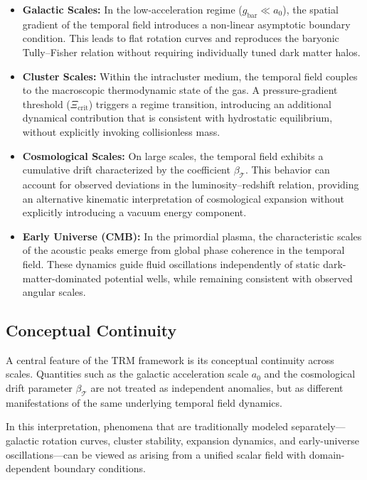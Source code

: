 \documentclass[11pt]{article}
\begin{document}
	\begin{itemize}

		\item \textbf{Galactic Scales:}
		In the low-acceleration regime ($g_{\mathrm{bar}} \ll a_0$), the spatial gradient of the temporal field introduces a non-linear asymptotic boundary condition. This leads to flat rotation curves and reproduces the baryonic Tully--Fisher relation without requiring individually tuned dark matter halos.

		\item \textbf{Cluster Scales:}
		Within the intracluster medium, the temporal field couples to the macroscopic thermodynamic state of the gas. A pressure-gradient threshold ($\Xi_{\mathrm{crit}}$) triggers a regime transition, introducing an additional dynamical contribution that is consistent with hydrostatic equilibrium, without explicitly invoking collisionless mass.

		\item \textbf{Cosmological Scales:}
		On large scales, the temporal field exhibits a cumulative drift characterized by the coefficient $\beta_{\mathcal{T}}$. This behavior can account for observed deviations in the luminosity--redshift relation, providing an alternative kinematic interpretation of cosmological expansion without explicitly introducing a vacuum energy component.

		\item \textbf{Early Universe (CMB):}
		In the primordial plasma, the characteristic scales of the acoustic peaks emerge from global phase coherence in the temporal field. These dynamics guide fluid oscillations independently of static dark-matter-dominated potential wells, while remaining consistent with observed angular scales.

	\end{itemize}

	\subsection{Conceptual Continuity}

	A central feature of the TRM framework is its conceptual continuity across scales. Quantities such as the galactic acceleration scale $a_0$ and the cosmological drift parameter $\beta_{\mathcal{T}}$ are not treated as independent anomalies, but as different manifestations of the same underlying temporal field dynamics.

	In this interpretation, phenomena that are traditionally modeled separately—galactic rotation curves, cluster stability, expansion dynamics, and early-universe oscillations—can be viewed as arising from a unified scalar field with domain-dependent boundary conditions.
\end{document}
